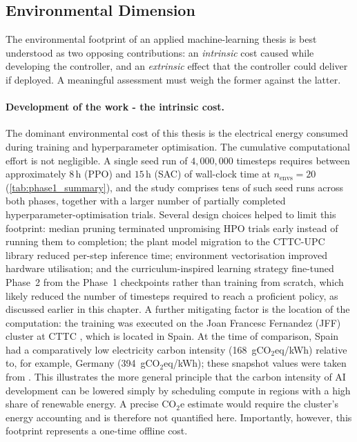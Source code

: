 \subsection{Environmental Dimension}

The environmental footprint of an applied machine-learning thesis is best understood as two opposing contributions: an \emph{intrinsic} cost caused while developing the controller, and an \emph{extrinsic} effect that the controller could deliver if deployed. A meaningful assessment must weigh the former against the latter.

\paragraph{Development of the work - the intrinsic cost.} The dominant environmental cost of this thesis is the electrical energy consumed during training and hyperparameter optimisation. The cumulative computational effort is not negligible. A single seed run of $4{,}000{,}000$ timesteps requires between approximately $8$\,h (PPO) and $15$\,h (SAC) of wall-clock time at $n_{\text{envs}} = 20$ (\autoref{tab:phase1_summary}), and the study comprises tens of such seed runs across both phases, together with a larger number of partially completed hyperparameter-optimisation trials. Several design choices helped to limit this footprint: median pruning terminated unpromising \ac{HPO} trials early instead of running them to completion; the plant model migration to the CTTC-UPC library reduced per-step inference time; environment vectorisation improved hardware utilisation; and the curriculum-inspired learning strategy fine-tuned Phase~2 from the Phase~1 checkpoints rather than training from scratch, which likely reduced the number of timesteps required to reach a proficient policy, as discussed earlier in this chapter. A further mitigating factor is the location of the computation: the training was executed on the Joan Francesc Fernandez (JFF) cluster at CTTC \cite{centre_tecnologic_de_transferencia_de_calor_cttc-upc_heat_2026}, which is located in Spain. At the time of comparison, Spain had a comparatively low electricity carbon intensity (168~gCO$_2$eq/kWh) relative to, for example, Germany (394~gCO$_2$eq/kWh); these snapshot values were taken from \cite{electricity_maps_live_2026}. This illustrates the more general principle that the carbon intensity of \ac{AI} development can be lowered simply by scheduling compute in regions with a high share of renewable energy. A precise $\mathrm{CO}_2$e estimate would require the cluster's energy accounting and is therefore not quantified here. Importantly, however, this footprint represents a one-time offline cost.

